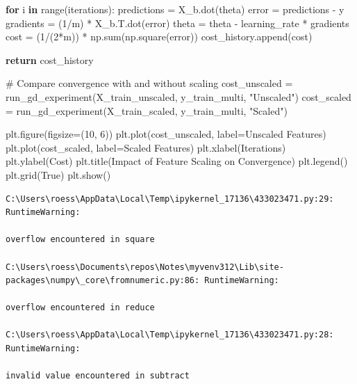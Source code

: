 \documentclass[
  letterpaper,
  DIV=11,
  numbers=noendperiod]{scrreprt}
\newenvironment{Shaded}{\begin{snugshade}}{\end{snugshade}}
\newcommand{\BuiltInTok}[1]{\textcolor[rgb]{0.00,0.23,0.31}{#1}}
\newcommand{\CommentTok}[1]{\textcolor[rgb]{0.37,0.37,0.37}{#1}}
\newcommand{\ControlFlowTok}[1]{\textcolor[rgb]{0.00,0.23,0.31}{\textbf{#1}}}
\newcommand{\DecValTok}[1]{\textcolor[rgb]{0.68,0.00,0.00}{#1}}
\newcommand{\KeywordTok}[1]{\textcolor[rgb]{0.00,0.23,0.31}{\textbf{#1}}}
\newcommand{\NormalTok}[1]{\textcolor[rgb]{0.00,0.23,0.31}{#1}}
\newcommand{\OperatorTok}[1]{\textcolor[rgb]{0.37,0.37,0.37}{#1}}
\newcommand{\StringTok}[1]{\textcolor[rgb]{0.13,0.47,0.30}{#1}}
\newcommand{\VariableTok}[1]{\textcolor[rgb]{0.07,0.07,0.07}{#1}}
\begin{document}
\begin{Shaded}
\begin{Highlighting}[]
    \ControlFlowTok{for}\NormalTok{ i }\KeywordTok{in} \BuiltInTok{range}\NormalTok{(iterations):}
\NormalTok{        predictions }\OperatorTok{=}\NormalTok{ X\_b.dot(theta)}
\NormalTok{        error }\OperatorTok{=}\NormalTok{ predictions }\OperatorTok{{-}}\NormalTok{ y}
\NormalTok{        gradients }\OperatorTok{=}\NormalTok{ (}\DecValTok{1}\OperatorTok{/}\NormalTok{m) }\OperatorTok{*}\NormalTok{ X\_b.T.dot(error)}
\NormalTok{        theta }\OperatorTok{=}\NormalTok{ theta }\OperatorTok{{-}}\NormalTok{ learning\_rate }\OperatorTok{*}\NormalTok{ gradients}
\NormalTok{        cost }\OperatorTok{=}\NormalTok{ (}\DecValTok{1}\OperatorTok{/}\NormalTok{(}\DecValTok{2}\OperatorTok{*}\NormalTok{m)) }\OperatorTok{*}\NormalTok{ np.}\BuiltInTok{sum}\NormalTok{(np.square(error))}
\NormalTok{        cost\_history.append(cost)}
    
    \ControlFlowTok{return}\NormalTok{ cost\_history}

\CommentTok{\# Compare convergence with and without scaling}
\NormalTok{cost\_unscaled }\OperatorTok{=}\NormalTok{ run\_gd\_experiment(X\_train\_unscaled, y\_train\_multi, }\StringTok{"Unscaled"}\NormalTok{)}
\NormalTok{cost\_scaled }\OperatorTok{=}\NormalTok{ run\_gd\_experiment(X\_train\_scaled, y\_train\_multi, }\StringTok{"Scaled"}\NormalTok{)}

\NormalTok{plt.figure(figsize}\OperatorTok{=}\NormalTok{(}\DecValTok{10}\NormalTok{, }\DecValTok{6}\NormalTok{))}
\NormalTok{plt.plot(cost\_unscaled, label}\OperatorTok{=}\StringTok{\textquotesingle{}Unscaled Features\textquotesingle{}}\NormalTok{)}
\NormalTok{plt.plot(cost\_scaled, label}\OperatorTok{=}\StringTok{\textquotesingle{}Scaled Features\textquotesingle{}}\NormalTok{)}
\NormalTok{plt.xlabel(}\StringTok{\textquotesingle{}Iterations\textquotesingle{}}\NormalTok{)}
\NormalTok{plt.ylabel(}\StringTok{\textquotesingle{}Cost\textquotesingle{}}\NormalTok{)}
\NormalTok{plt.title(}\StringTok{\textquotesingle{}Impact of Feature Scaling on Convergence\textquotesingle{}}\NormalTok{)}
\NormalTok{plt.legend()}
\NormalTok{plt.grid(}\VariableTok{True}\NormalTok{)}
\NormalTok{plt.show()}
\end{Highlighting}
\end{Shaded}

\begin{verbatim}
C:\Users\roess\AppData\Local\Temp\ipykernel_17136\433023471.py:29: RuntimeWarning:

overflow encountered in square

C:\Users\roess\Documents\repos\Notes\myvenv312\Lib\site-packages\numpy\_core\fromnumeric.py:86: RuntimeWarning:

overflow encountered in reduce

C:\Users\roess\AppData\Local\Temp\ipykernel_17136\433023471.py:28: RuntimeWarning:

invalid value encountered in subtract
\end{verbatim}
\end{document}
